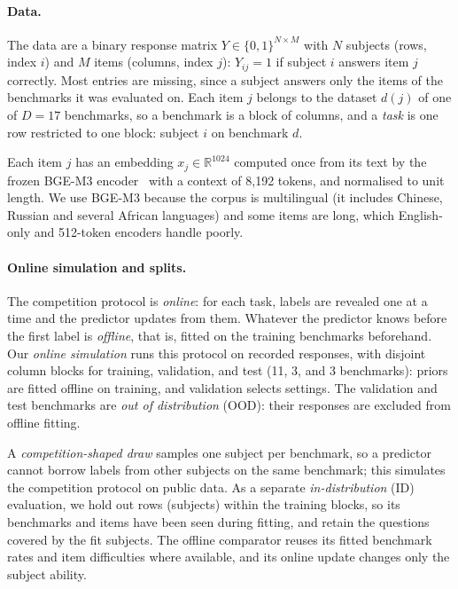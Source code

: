 \label{sec:setting-online}
\paragraph{Data.} The data are a binary response matrix $Y\in\{0,1\}^{N\times M}$ with $N$ subjects (rows, index $i$) and $M$ items (columns, index $j$): $Y_{ij}=1$ if subject $i$ answers item $j$ correctly. Most entries are missing, since a subject answers only the items of the benchmarks it was evaluated on. Each item $j$ belongs to the dataset $d(j)$ of one of $D=17$ benchmarks, so a benchmark is a block of columns, and a \emph{task} is one row restricted to one block: subject $i$ on benchmark $d$.

Each item $j$ has an embedding $x_j\in\mathbb R^{1024}$ computed once from its text by the frozen BGE-M3 encoder~\citep{chen2024bge} with a context of 8,192 tokens, and normalised to unit length. We use BGE-M3 because the corpus is multilingual (it includes Chinese, Russian and several African languages) and some items are long, which English-only and 512-token encoders handle poorly.

\paragraph{Online simulation and splits.} The competition protocol is \emph{online}: for each task, labels are revealed one at a time and the predictor updates from them. Whatever the predictor knows before the first label is \emph{offline}, that is, fitted on the training benchmarks beforehand. Our \emph{online simulation} runs this protocol on recorded responses, with disjoint column blocks for training, validation, and test (11, 3, and 3 benchmarks): priors are fitted offline on training, and validation selects settings. The validation and test benchmarks are \emph{out of distribution} (OOD): their responses are excluded from offline fitting.

A \emph{competition-shaped draw} samples one subject per benchmark, so a predictor cannot borrow labels from other subjects on the same benchmark; this simulates the competition protocol on public data. As a separate \emph{in-distribution} (ID) evaluation, we hold out rows (subjects) within the training blocks, so its benchmarks and items have been seen during fitting, and retain the questions covered by the fit subjects. The offline comparator reuses its fitted benchmark rates and item difficulties where available, and its online update changes only the subject ability.

